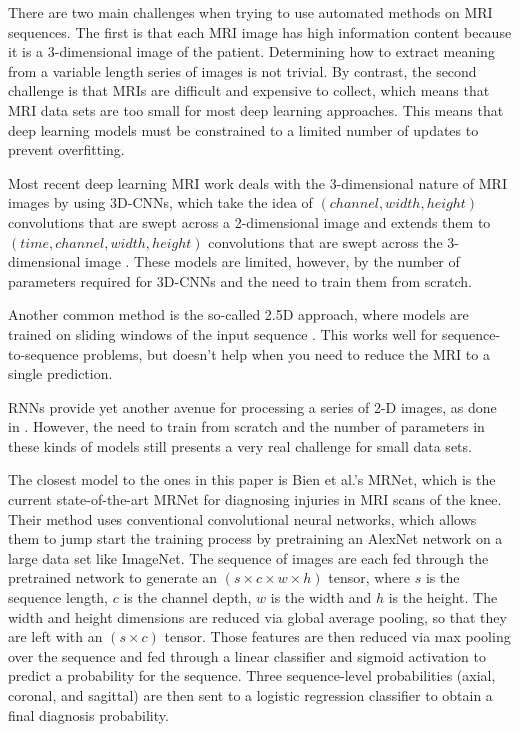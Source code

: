 \documentclass[10pt,twocolumn,letterpaper]{article}
\begin{document}
There are two main challenges when trying to use automated methods on MRI sequences. The first is that each MRI image has high information content because it is a 3-dimensional image of the patient. Determining how to extract meaning from a variable length series of images is not trivial. By contrast, the second challenge is that MRIs are difficult and expensive to collect, which means that MRI data sets are too small for most deep learning approaches. This means that deep learning models must be constrained to a limited number of updates to prevent overfitting.

Most recent deep learning MRI work deals with the 3-dimensional nature of MRI images by using 3D-CNNs, which take the idea of $(channel, width, height)$ convolutions that are swept across a 2-dimensional image and extends them to $(time, channel, width, height)$ convolutions that are swept across the 3-dimensional image
\cite{hosseini2016alzheimer,wei2018flair,khvostikov20183d,zou20173d}. These models are limited, however, by the number of parameters required for 3D-CNNs and the need to train them from scratch.

Another common method is the so-called 2.5D approach, where models are trained on sliding windows of the input sequence \cite{roth2015improving,alkadi20182,grovik2019deep}. This works well for sequence-to-sequence problems, but doesn't help when you need to reduce the MRI to a single prediction.

RNNs provide yet another avenue for processing a series of 2-D images, as done in \cite{qin2019convolutional,han2018mri}. However, the need to train from scratch and the number of parameters in these kinds of models still presents a very real challenge for small data sets.

The closest model to the ones in this paper is Bien et al.'s MRNet\cite{bien2018deep}, which is the current state-of-the-art MRNet for diagnosing injuries in MRI scans of the knee. Their method uses conventional convolutional neural networks, which allows them to jump start the training process by pretraining an AlexNet\cite{krizhevsky2012imagenet} network on a large data set like ImageNet\cite{imagenet_cvpr09}. The sequence of images are each fed through the pretrained network to generate an $(s \times c \times w \times h)$ tensor, where $s$ is the sequence length, $c$ is the channel depth, $w$ is the width and $h$ is the height. The width and height dimensions are reduced via global average pooling\cite{lin2013network}, so that they are left with an $(s \times c)$ tensor. Those features are then reduced via max pooling over the sequence and fed through a linear classifier and sigmoid activation to predict a probability for the sequence. Three sequence-level probabilities (axial, coronal, and sagittal) are then sent to a logistic regression classifier to obtain a final diagnosis probability.
\end{document}
